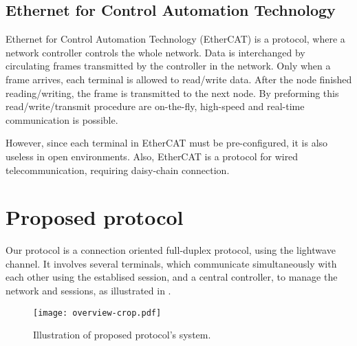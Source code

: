 ﻿\documentclass[twocolumn,9pt]{ltjsarticle}
\renewcommand{\ref}{\Cref}
\begin{document}
\subsection{Ethernet for Control Automation Technology}
Ethernet for Control Automation Technology (EtherCAT) is a protocol, where a network controller controls the whole network.
Data is interchanged by circulating frames transmitted by the controller in the network.
Only when a frame arrives, each terminal is allowed to read/write data.
After the node finished reading/writing, the frame is transmitted to the next node.
By preforming this read/write/transmit procedure are on-the-fly, high-speed and real-time communication is possible.

However, since each terminal in EtherCAT must be pre-configured, it is also useless in open environments.
Also, EtherCAT is a protocol for wired telecommunication, requiring daisy-chain connection.

\section{Proposed protocol}
Our protocol is a connection oriented full-duplex protocol, using the lightwave channel.
It involves several terminals, which communicate simultaneously with each other using the establised session, and a central controller, to manage the network and sessions, as illustrated in \ref{fig:overview}.

\begin{figure}[tb]
  \centering
  \texttt{[image: overview-crop.pdf]}
  \caption{\label{fig:overview}
    Illustration of proposed protocol's system.
  }
\end{figure}
\end{document}
